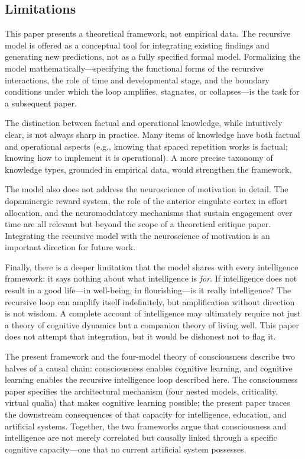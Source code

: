 \documentclass[12pt,a4paper]{article}
\begin{document}
\subsection{Limitations}

This paper presents a theoretical framework, not empirical data. The recursive model is offered as a conceptual tool for integrating existing findings and generating new predictions, not as a fully specified formal model. Formalizing the model mathematically---\hspace{0pt}specifying the functional forms of the recursive interactions, the role of time and developmental stage, and the boundary conditions under which the loop amplifies, stagnates, or collapses---\hspace{0pt}is the task for a subsequent paper.

The distinction between factual and operational knowledge, while intuitively clear, is not always sharp in practice. Many items of knowledge have both factual and operational aspects (e.g., knowing that spaced repetition works is factual; knowing how to implement it is operational). A more precise taxonomy of knowledge types, grounded in empirical data, would strengthen the framework.

The model also does not address the neuroscience of motivation in detail. The dopaminergic reward system, the role of the anterior cingulate cortex in effort allocation, and the neuromodulatory mechanisms that sustain engagement over time are all relevant but beyond the scope of a theoretical critique paper. Integrating the recursive model with the neuroscience of motivation is an important direction for future work.

Finally, there is a deeper limitation that the model shares with every intelligence framework: it says nothing about what intelligence is \emph{for}. If intelligence does not result in a good life---\hspace{0pt}in well-being, in flourishing---\hspace{0pt}is it really intelligence? The recursive loop can amplify itself indefinitely, but amplification without direction is not wisdom. A complete account of intelligence may ultimately require not just a theory of cognitive dynamics but a companion theory of living well. This paper does not attempt that integration, but it would be dishonest not to flag it.

The present framework and the four-model theory of consciousness \citep{Gruber2026} describe two halves of a causal chain: consciousness enables cognitive learning, and cognitive learning enables the recursive intelligence loop described here. The consciousness paper specifies the architectural mechanism (four nested models, criticality, virtual qualia) that makes cognitive learning possible; the present paper traces the downstream consequences of that capacity for intelligence, education, and artificial systems. Together, the two frameworks argue that consciousness and intelligence are not merely correlated but causally linked through a specific cognitive capacity---\hspace{0pt}one that no current artificial system possesses.
\end{document}

